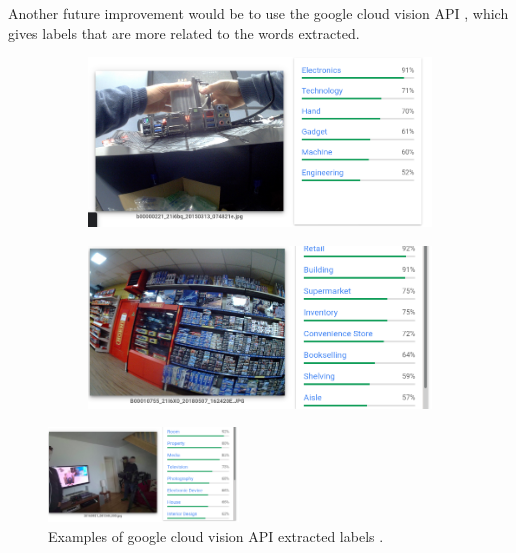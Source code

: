 Another future improvement would be to use the google cloud vision API \cite{google}, which gives labels that are more related to the words extracted. 


\begin{figure}[H]
    \centering
    \captionsetup{justification=centering}
    \begin{subfigure}{0.45\textwidth}
    \includegraphics[width=\textwidth]{Sections/8Conclusion/images/google.png} 
  
    \end{subfigure}
    \begin{subfigure}{0.45\textwidth}
    \includegraphics[width=\textwidth]{Sections/8Conclusion/images/labels.png}
    \end{subfigure}

  \end{figure}


\begin{figure}[H]
    \centering
    \captionsetup{justification=centering}

    \includegraphics[width=0.45\textwidth]{Sections/8Conclusion/images/google_labels_2.png}
    
    \caption[Google cloud vision API labels]{Examples of google cloud vision API extracted labels \cite{google}.}
\end{figure}

